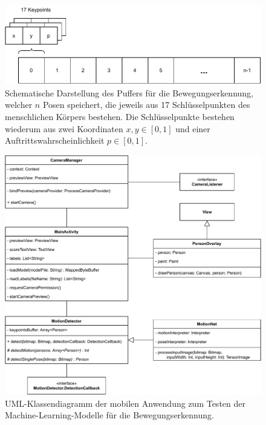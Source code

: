\begin{figure}
    \includegraphics[width=\textwidth]{images/camera_frame_buffer.pdf}
    \caption{Schematische Darstellung des Puffers für die Bewegungserkennung,
    welcher $n$ Posen speichert, die jeweils aus 17 Schlüsselpunkten des menschlichen Körpers bestehen. Die Schlüsselpunkte bestehen wiederum aus zwei Koordinaten $x, y \in [0, 1]$ und einer Auftrittswahrscheinlichkeit $p \in [0, 1]$.}
    \label{fig:camera-frame-buffer}
\end{figure}

\begin{figure}
    \includegraphics[width=\textwidth]{images/app_uml.pdf}
    \caption{UML-Klassendiagramm der mobilen Anwendung zum Testen der
    Machine-Learning-Modelle für die Bewegungserkennung.}
    \label{fig:uml-app}
\end{figure}

